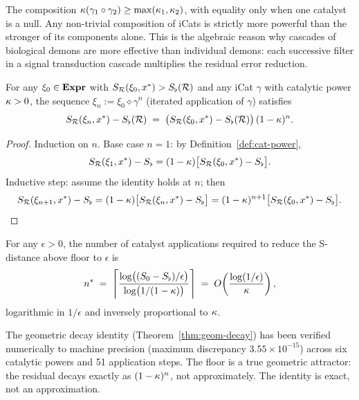 \begin{remark}\label{rem:monotone}
The composition $\kappa(\gamma_1 \circ \gamma_2) \geq \max(\kappa_1, \kappa_2)$, with equality only when one catalyst is a null. Any non-trivial composition of iCats is strictly more powerful than the stronger of its components alone. This is the algebraic reason why cascades of biological demons are more effective than individual demons: each successive filter in a signal transduction cascade multiplies the residual error reduction.
\end{remark}

\begin{theorem}\label{thm:geom-decay}
For any $\xi_0 \in \mathbf{Expr}$ with $S_{\mathcal{R}}(\xi_0, x^*) > S_{\flat}(\mathcal{R})$ and any iCat $\gamma$ with catalytic power $\kappa > 0$, the sequence $\xi_n := \xi_0 \diamond \gamma^n$ (iterated application of $\gamma$) satisfies
\[
S_{\mathcal{R}}(\xi_n, x^*) - S_{\flat}(\mathcal{R}) \;=\; \bigl(S_{\mathcal{R}}(\xi_0, x^*) - S_{\flat}(\mathcal{R})\bigr)\,(1 - \kappa)^n.
\]
\end{theorem}

\begin{proof}
Induction on $n$. Base case $n=1$: by Definition~\ref{def:cat-power},
\[
S_{\mathcal{R}}(\xi_1, x^*) - S_{\flat} = (1 - \kappa)\bigl[S_{\mathcal{R}}(\xi_0, x^*) - S_{\flat}\bigr].
\]
Inductive step: assume the identity holds at $n$; then
\[
S_{\mathcal{R}}(\xi_{n+1}, x^*) - S_{\flat} = (1 - \kappa)\bigl[S_{\mathcal{R}}(\xi_n, x^*) - S_{\flat}\bigr] = (1 - \kappa)^{n+1}\bigl[S_{\mathcal{R}}(\xi_0, x^*) - S_{\flat}\bigr]. \qedhere
\]
\end{proof}

\begin{corollary}\label{cor:conv-rate}
For any $\epsilon > 0$, the number of catalyst applications required to reduce the S-distance above floor to $\epsilon$ is
\[
n^* \;=\; \left\lceil \frac{\log\bigl((S_0 - S_{\flat})/\epsilon\bigr)}{\log\bigl(1/(1-\kappa)\bigr)} \right\rceil \;=\; O\!\left(\frac{\log(1/\epsilon)}{\kappa}\right),
\]
logarithmic in $1/\epsilon$ and inversely proportional to $\kappa$.
\end{corollary}

The geometric decay identity (Theorem~\ref{thm:geom-decay}) has been verified numerically to machine precision (maximum discrepancy $3.55 \times 10^{-15}$) across six catalytic powers and 51 application steps. The floor is a true geometric attractor: the residual decays exactly as $(1-\kappa)^n$, not approximately. The identity is exact, not an approximation.

